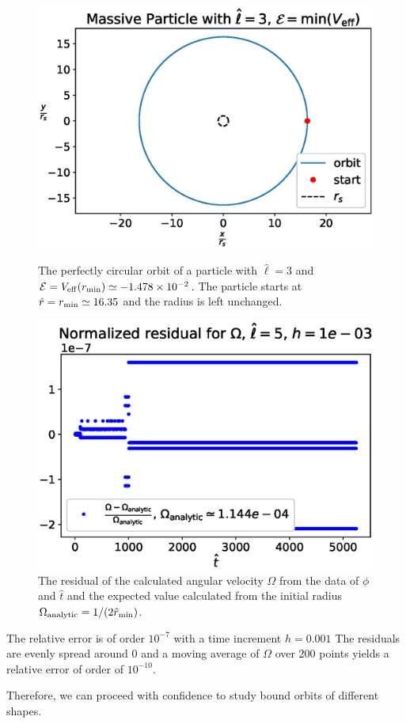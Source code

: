 \begin{figure}[h]
    \begin{minipage}{0.48\textwidth}
        \centering
        \includegraphics[width=\textwidth]{Figures/chapter2/circular_orbit.eps}
        \caption{The perfectly circular orbit of a particle with $\hat \ell = 3$
        and $\mathcal E = V_{\rm eff}(r_{\rm min}) \simeq \num{-1.478e-02}$.
        The particle starts at $\hat r = r_{\rm min} \simeq 16.35$ and the
        radius is left unchanged.}
        \label{cap2:fig:circ_orbit}
    \end{minipage}
    \hspace{0.015 \textwidth}
    \begin{minipage}{0.48\textwidth}
        \centering
        \includegraphics[width=\textwidth]{Figures/chapter2/circular_orbit_res.eps}
        \caption{The residual of the calculated angular velocity $\Omega$ from the
        data of $\phi$ and $\hat t$ and the expected value calculated from the
        initial radius $\Omega_{\rm analytic} = 1 / (2 \hat r_{\rm min})$.}
        \label{cap2:fig:circ_orbit_res}
    \end{minipage}
\end{figure}

The relative error is of order $10^{-7}$ with a time increment $h = 0.001$
The residuals are evenly spread around 0 and a moving average of $\Omega$ over 200
points yields a relative error of order of $10^{-10}$.

Therefore, we can proceed with confidence to study bound orbits of different
shapes.
